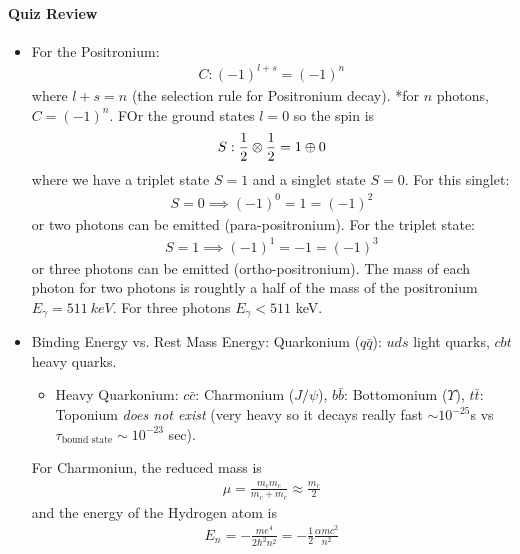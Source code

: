 \documentclass[../main.tex]{subfiles}
\begin{document}
\newpage
{}

\paragraph*{Quiz Review} 
\begin{itemize}
    \item For the Positronium:
    \begin{align*}
        C: (-1)^{l+s} = (-1)^n
    \end{align*}
    where $l + s = n$ (the selection rule for Positronium decay). *for $n$ photons, $C = (-1)^n$. 
    FOr the ground states $l = 0$ so the spin is
    \begin{align*}
        S: \frac{1}{2} \otimes \frac{1}{2} = 1 \oplus 0
    \end{align*}
    where we have a triplet state $S = 1$ and a singlet state $S = 0$. For this singlet:
    \begin{align*}
        S = 0 \implies (-1)^0 = 1 = (-1)^2
    \end{align*}
    or two photons can be emitted (para-positronium). For the triplet state:
    \begin{align*}
        S = 1 \implies (-1)^1 = -1 = (-1)^3
    \end{align*}
    or three photons can be emitted (ortho-positronium). The mass of each photon for two photons is
    roughtly a half of the mass of the positronium $E_\gamma = \qty{511}{keV}$. For three photons
    $E_\gamma < 511$ keV. 
    \item Binding Energy vs. Rest Mass Energy: Quarkonium ($q \bar q$): $uds$ light quarks,
    $cbt$ heavy quarks.
    \begin{itemize}
        \item Heavy Quarkonium: $c\bar c$: Charmonium ($J/\psi$), $b\bar b$: Bottomonium
        ($\Upsilon$), $t\bar t$: Toponium \emph{does not exist}
        (very heavy so it decays really fast $\sim 10^{-25}$s vs
        $\tau_{\text{bound state}} \sim 10^{-23}$ sec).
    \end{itemize}
    For Charmoniun, the reduced mass is 
    \begin{align*}
        \mu = \frac{m_c m_c}{m_c + m_c} \approx \frac{m_c}{2}
    \end{align*}
    and the energy of the Hydrogen atom is
    \begin{align*}
        E_n = -\frac{m e^4}{2\hbar^2 n^2} = -\frac{1}{2} \frac{\alpha m c^2}{n^2}
    \end{align*}

\end{itemize}
\end{document}
